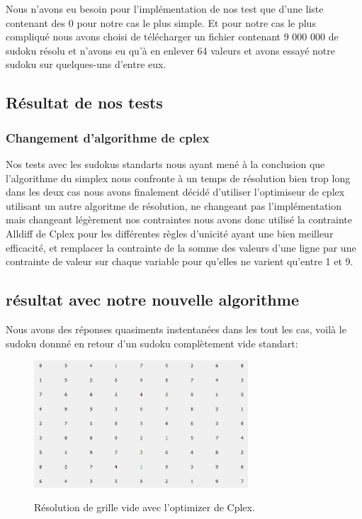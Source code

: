 Nous n'avons eu besoin pour l'implémentation de nos test que d'une liste contenant des 0 pour notre cas le plus simple. Et pour notre cas le plus compliqué nous avons choisi de télécharger un fichier contenant 9 000 000 de sudoku résolu et n'avons eu qu'à en enlever 64 valeurs et avons essayé notre sudoku sur quelques-uns d'entre eux.

\subsection{Résultat de nos tests}
\subsubsection{Changement d'algorithme de cplex}
Nos tests avec les sudokus standarts nous ayant mené à la conclusion que l'algorithme du simplex nous confronte à un temps de résolution bien trop long dans les deux cas nous avons finalement décidé d'utiliser l'optimiseur de cplex utilisant un autre algoritme de résolution, ne changeant pas l'implémentation mais changeant légèrement nos contraintes nous avons donc utilisé la contrainte Alldiff de Cplex pour les différentes règles d'unicité ayant une bien meilleur efficacité, et remplacer la contrainte de la somme des valeurs d'une ligne par une contrainte de valeur sur chaque variable pour qu'elles ne varient qu'entre 1 et 9.
\newpage
\subsection{résultat avec notre nouvelle algorithme}
Nous avons des réponses quasiments instentanées dans les tout les cas, voilà le sudoku donnné en retour d'un sudoku complètement vide standart:

\begin{figure}[h]
  \begin{center}
\includegraphics[width=8cm]{./images/Res_Vide.png}\label{Test_Cplex}
\caption{Résolution de grille vide avec l'optimizer de Cplex.}
\end{center}
\end{figure}

